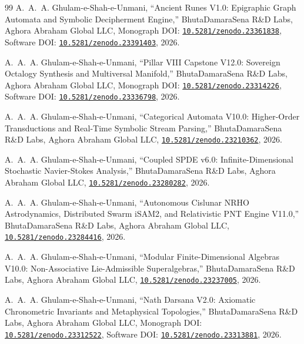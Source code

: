 \documentclass[11pt,a4paper,reqno]{article}
\newcommand{\zenodo}[1]{\href{https://doi.org/10.5281/zenodo.#1}{\nolinkurl{10.5281/zenodo.#1}}}
\theoremstyle{definition}
\theoremstyle{remark}
\begin{document}
\begin{thebibliography}{99}
A.~A.~A. Ghulam-e-Shah-e-Unmani, ``Ancient Runes V1.0: Epigraphic Graph Automata and Symbolic Decipherment Engine,'' BhutaDamaraSena R\&D Labs, Aghora Abraham Global LLC, Monograph DOI: \zenodo{23361838}, Software DOI: \zenodo{23391403}, 2026.

A.~A.~A. Ghulam-e-Shah-e-Unmani, ``Pillar VIII Capstone V12.0: Sovereign Octalogy Synthesis and Multiversal Manifold,'' BhutaDamaraSena R\&D Labs, Aghora Abraham Global LLC, Monograph DOI: \zenodo{23314226}, Software DOI: \zenodo{23336798}, 2026.

A.~A.~A. Ghulam-e-Shah-e-Unmani, ``Categorical Automata V10.0: Higher-Order Transductions and Real-Time Symbolic Stream Parsing,'' BhutaDamaraSena R\&D Labs, Aghora Abraham Global LLC, \zenodo{23210362}, 2026.

A.~A.~A. Ghulam-e-Shah-e-Unmani, ``Coupled SPDE v6.0: Infinite-Dimensional Stochastic Navier-Stokes Analysis,'' BhutaDamaraSena R\&D Labs, Aghora Abraham Global LLC, \zenodo{23280282}, 2026.

A.~A.~A. Ghulam-e-Shah-e-Unmani, ``Autonomous Cislunar NRHO Astrodynamics, Distributed Swarm iSAM2, and Relativistic PNT Engine V11.0,'' BhutaDamaraSena R\&D Labs, Aghora Abraham Global LLC, \zenodo{23284416}, 2026.

A.~A.~A. Ghulam-e-Shah-e-Unmani, ``Modular Finite-Dimensional Algebras V10.0: Non-Associative Lie-Admissible Superalgebras,'' BhutaDamaraSena R\&D Labs, Aghora Abraham Global LLC, \zenodo{23237005}, 2026.

A.~A.~A. Ghulam-e-Shah-e-Unmani, ``Nath Darsana V2.0: Axiomatic Chronometric Invariants and Metaphysical Topologies,'' BhutaDamaraSena R\&D Labs, Aghora Abraham Global LLC, Monograph DOI: \zenodo{23312522}, Software DOI: \zenodo{23313881}, 2026.

\end{thebibliography}
\end{document}
